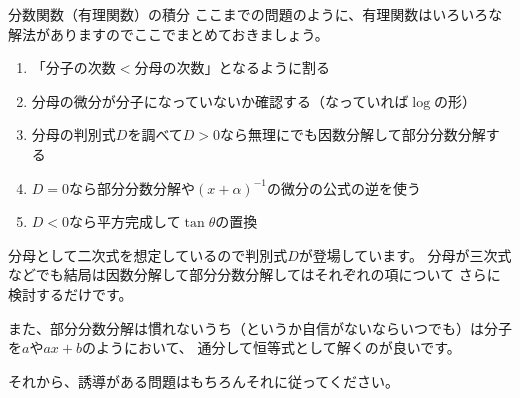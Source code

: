 \documentclass[a4paper]{ltjsarticle}
\begin{document}
\begin{intprob}
\end{intprob}

\begin{intprob}
\end{intprob}

\begin{itembox}[l]{分数関数（有理関数）の積分}
  ここまでの問題のように、有理関数はいろいろな解法がありますのでここでまとめておきましょう。
  \begin{enumerate}[label=\arabic*.]
    \item 「分子の次数$<$分母の次数」となるように割る
    \item 分母の微分が分子になっていないか確認する（なっていれば$\log$の形）
    \item 分母の判別式$D$を調べて$D> 0$なら無理にでも因数分解して部分分数分解する
    \item $D=0$なら部分分数分解や$(x+\alpha)^{-1}$の微分の公式の逆を使う
    \item $D<0$なら平方完成して$\tan\theta$の置換
  \end{enumerate}
  分母として二次式を想定しているので判別式$D$が登場しています。
  分母が三次式などでも結局は因数分解して部分分数分解してはそれぞれの項について
  さらに検討するだけです。

  また、部分分数分解は慣れないうち（というか自信がないならいつでも）は分子を$a$や$ax + b$のようにおいて、
  通分して恒等式として解くのが良いです。

  それから、誘導がある問題はもちろんそれに従ってください。
\end{itembox}
\end{document}
